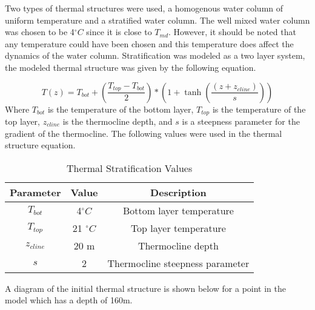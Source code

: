 Two types of thermal structures were used, a homogenous water column of uniform temperature and a stratified water column. The 
well mixed water column was chosen to be 4$^{\circ}C$ since it is close to $T_{md}$. However, it should be noted that any temperature could have been chosen and this 
temperature does affect the dynamics of the water column. Stratification was modeled as a two layer system, the modeled thermal structure was given by the following equation. 

\begin{equation} 
	T(z)=T_{bot}+(\frac{T_{top}-T_{bot}}{2})*(1+\tanh(\frac{(z+z_{cline})}{s}))
\end{equation}
Where $T_{bot}$ is the temperature of the bottom layer, $T_{top}$ is the temperature of the top layer, $z_{cline}$ is the thermocline depth, and $s$ 
is a steepness parameter for the gradient of the thermocline. The following values were used in the thermal structure equation. 



\begin{table}[H]
	\centering
		\caption{Thermal Stratification Values }
		\vspace{6pt} 
	\label{table:stratVals} %
	\begin{tabular}{c c c}
	\hline \hline 									%
	\textbf{Parameter} & \textbf{Value} & \textbf{Description} \\ [0.5ex] %
	\hline 										
	$T_{bot}$ & 4$^{\circ}C$ & Bottom layer temperature  \\ 	
	$T_{top}$ & 21 $^{\circ}C$ & Top layer temperature \\ 
	$z_{cline}$ & 20 m & Thermocline depth  \\ 
	$s$ & 2 & Thermocline steepness parameter  \\ [1ex] 	%
	\hline 
	\end{tabular}		
\end{table}

A diagram of the initial thermal structure is shown below for a point in the model which has a depth of 160m.

